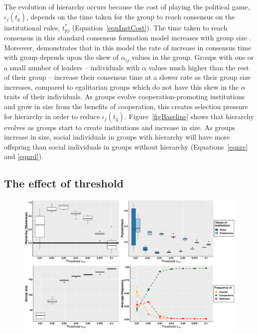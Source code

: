\documentclass{rstb}
\begin{document}
\begin{linenumbers}
 The evolution of hierarchy occurs because the cost of playing the political game, $\iota_j(t_\mathrm{g})$, depends on the time taken for the group to reach consensus on the institutional rules, $t_{\mathrm{p}j}^*$ (Equation~\ref{eqnInstCost}). The time taken to reach consensus in this standard consensus formation model increases with group size \cite{Perret:2020:a}. Moreover, \cite{Perret:2020:a} demonstrates that in this model the rate of increase in consensus time with group depends upon the skew of $\alpha_{ij}$ values in the group. Groups with one or a small number of leaders -- individuals with $\alpha$ values much higher than the rest of their group -- increase their consensus time at a slower rate as their group size increases, compared to egalitarian groups which do not have this skew in the $\alpha$ traits of their individuals. As groups evolve cooperation-promoting institutions and grow in size from the benefits of cooperation, this creates selection pressure for hierarchy in order to reduce $\iota_j(t_\mathrm{g})$. Figure~\ref{figBaseline} shows that hierarchy evolves as groups start to create institutions and increase in size. As groups increase in size, social individuals in groups with hierarchy will have more offspring than social individuals in groups without hierarchy (Equations~\ref{eqnrc} and \ref{eqnrd}). 

\subsection*{The effect of threshold}

\begin{figure}
    \centering
    \includegraphics[width=0.8\linewidth]{Figures/pt_xThr.pdf}
    \caption{}
    \label{figXThr}
\end{figure}



\end{linenumbers}
\end{document}
